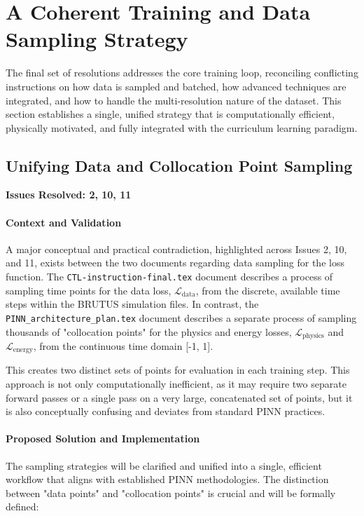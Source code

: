 \documentclass[11pt, a4paper]{article}
\begin{document}
\section{A Coherent Training and Data Sampling Strategy}
The final set of resolutions addresses the core training loop, reconciling conflicting instructions on how data is sampled and batched, how advanced techniques are integrated, and how to handle the multi-resolution nature of the dataset. This section establishes a single, unified strategy that is computationally efficient, physically motivated, and fully integrated with the curriculum learning paradigm.

\subsection{Unifying Data and Collocation Point Sampling}
\textbf{Issues Resolved: 2, 10, 11}
\paragraph{Context and Validation}
A major conceptual and practical contradiction, highlighted across Issues 2, 10, and 11, exists between the two documents regarding data sampling for the loss function. The \texttt{CTL-instruction-final.tex} document describes a process of sampling time points for the data loss, $\mathcal{L}_{\text{data}}$, from the discrete, available time steps within the BRUTUS simulation files. In contrast, the \texttt{PINN\_architecture\_plan.tex} document describes a separate process of sampling thousands of "collocation points" for the physics and energy losses, $\mathcal{L}_{\text{physics}}$ and $\mathcal{L}_{\text{energy}}$, from the continuous time domain [-1, 1].

This creates two distinct sets of points for evaluation in each training step. This approach is not only computationally inefficient, as it may require two separate forward passes or a single pass on a very large, concatenated set of points, but it is also conceptually confusing and deviates from standard PINN practices.

\paragraph{Proposed Solution and Implementation}
The sampling strategies will be clarified and unified into a single, efficient workflow that aligns with established PINN methodologies. The distinction between "data points" and "collocation points" is crucial and will be formally defined:
\end{document}
